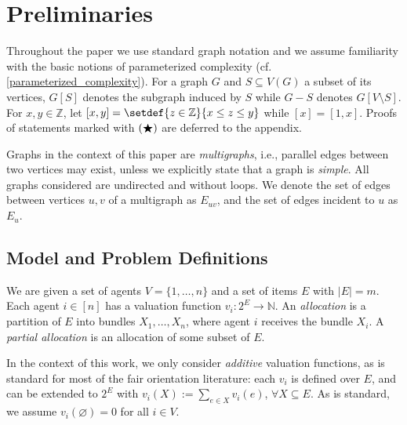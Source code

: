 \section{Preliminaries}\label{sec:preliminaries}






Throughout the paper we use standard graph notation \cite{books/Diestel17}
and we assume familiarity with the basic notions of parameterized complexity (cf. \cref{parameterized_complexity}). %
For a graph $G$ and $S \subseteq V(G)$ a subset of its vertices,
$G[S]$ denotes the subgraph induced by $S$ while $G - S$ denotes $G[V \setminus S]$.
For $x, y \in \mathbb{Z}$, let $[x, y] = \setdef{z \in \mathbb{Z}}{x \leq z \leq y}$ while $[x] = [1,x]$.
Proofs of statements marked with $(\bigstar)$ are deferred to the appendix.

Graphs in the context of this paper are \emph{multigraphs}, i.e., parallel edges between two vertices may exist, unless we explicitly state that a graph is \emph{simple}. All graphs considered are undirected and without loops.
We denote the set of edges between vertices $u,v$ of a multigraph as $E_{uv}$, and the set of edges incident to $u$ as $E_u$.






\subsection{Model and Problem Definitions}

We are given a set of agents $V=\{1,\ldots,n\}$ and a set of items $E$ with $|E|=m$. Each agent $i \in [n]$ has a valuation function $v_i \colon 2^E \to \mathbb{N}$. An \emph{allocation} is a partition of $E$ into bundles $X_1,\ldots,X_n$, where agent $i$ receives the bundle $X_i$. A \emph{partial allocation} is an allocation of some subset of $E$. 

In the context of this work, we only consider \emph{additive} valuation functions, as is standard for most of the fair orientation literature:
each $v_i$ is defined over $E$, and can be extended to $2^E$ with $v_i(X):=\sum_{e\in X}v_i(e)$, $\forall X\subseteq E$. As is standard, we assume $v_i(\varnothing)=0$ for all $i\in V$.

